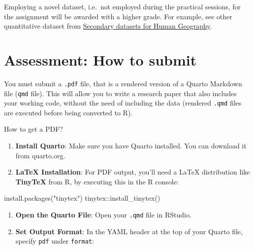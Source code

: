 \documentclass[
  letterpaper,
  DIV=11,
  numbers=noendperiod]{scrreprt}
\newenvironment{Shaded}{\begin{snugshade}}{\end{snugshade}}
\newcommand{\FunctionTok}[1]{\textcolor[rgb]{0.28,0.35,0.67}{#1}}
\newcommand{\NormalTok}[1]{\textcolor[rgb]{0.00,0.23,0.31}{#1}}
\newcommand{\SpecialCharTok}[1]{\textcolor[rgb]{0.37,0.37,0.37}{#1}}
\newcommand{\StringTok}[1]{\textcolor[rgb]{0.13,0.47,0.30}{#1}}
\providecommand{\tightlist}{%
  \setlength{\itemsep}{0pt}\setlength{\parskip}{0pt}}\usepackage{longtable,booktabs,array}
\begin{document}
Employing a novel dataset, i.e.~not employed during the practical
sessions, for the assignment will be awarded with a higher grade. For
example, see other quantitative dataset from
\href{https://canvas.liverpool.ac.uk/courses/84668/files/12951952?module_item_id=2424177}{Secondary
datasets for Human Geography}.


\chapter*{Assessment: How to submit}\label{assessment-how-to-submit}


You must submit a \texttt{.pdf} file, that is a rendered version of a
Quarto Markdown file (\texttt{qmd} file). This will allow you to write a
research paper that also includes your working code, without the need of
including the data (rendered \texttt{.qmd} files are executed before
being converted to R).

How to get a PDF?

\begin{enumerate}
\def\labelenumi{\arabic{enumi}.}
\tightlist
\item
  \textbf{Install Quarto}: Make sure you have Quarto installed. You can
  download it from quarto.org.
\item
  \textbf{LaTeX Installation}: For PDF output, you'll need a LaTeX
  distribution like \textbf{TinyTeX} from R, by executing this in the R
  console:
\end{enumerate}

\begin{Shaded}
\begin{Highlighting}[]
\FunctionTok{install.packages}\NormalTok{(}\StringTok{"tinytex"}\NormalTok{)}
\NormalTok{tinytex}\SpecialCharTok{::}\FunctionTok{install\_tinytex}\NormalTok{()}
\end{Highlighting}
\end{Shaded}

\begin{enumerate}
\def\labelenumi{\arabic{enumi}.}
\setcounter{enumi}{2}
\tightlist
\item
  \textbf{Open the Quarto File}: Open your \texttt{.qmd} file in
  RStudio.
\item
  \textbf{Set Output Format}: In the YAML header at the top of your
  Quarto file, specify \texttt{pdf} under \texttt{format}:
\end{enumerate}
\end{document}
